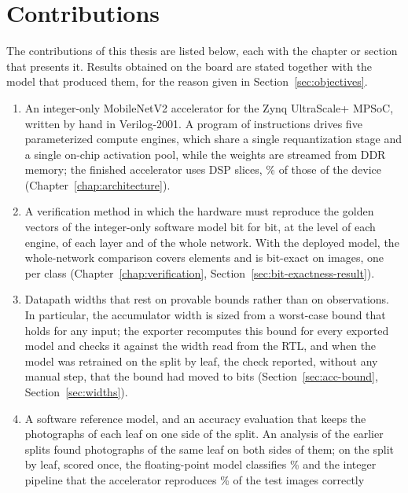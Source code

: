 \section{Contributions}
\label{sec:contributions}

The contributions of this thesis are listed below, each with the chapter or
section that presents it. Results obtained on the board are stated together
with the model that produced them, for the reason given in
Section~\ref{sec:objectives}.

\begin{enumerate}
  \item An integer-only MobileNetV2 accelerator for the Zynq UltraScale+
    MPSoC, written by hand in Verilog-2001. A program of \thInstructions{}
    instructions drives five parameterized compute engines, which share a
    single requantization stage and a single on-chip activation pool, while
    the weights are streamed from DDR memory; the finished accelerator uses
    \thDspAccelAxi{} DSP slices, \thDspPctAccelAxi\% of those of the device
    (Chapter~\ref{chap:architecture}).
  \item A verification method in which the hardware must reproduce the golden
    vectors of the integer-only software model bit for bit, at the level of
    each engine, of each layer and of the whole network. With the deployed
    model, the whole-network comparison covers \thElements{} elements and is
    bit-exact on \thImagesVerified{} images, one per class
    (Chapter~\ref{chap:verification}, Section~\ref{sec:bit-exactness-result}).
  \item Datapath widths that rest on provable bounds rather than on
    observations. In particular, the accumulator width is sized from a
    worst-case bound that holds for any input; the exporter recomputes this
    bound for every exported model and checks it against the width read from
    the RTL, and when the model was retrained on the split by leaf, the check
    reported, without any manual step, that the bound had moved to
    \thAccBoundBits{} bits (Section~\ref{sec:acc-bound},
    Section~\ref{sec:widths}).
  \item A software reference model, and an accuracy evaluation that keeps the
    photographs of each leaf on one side of the split. An analysis of the
    earlier splits found photographs of the same leaf on both sides of them;
    on the split by leaf, scored once, the floating-point model classifies
    \thAccFloat\% and the integer pipeline that the accelerator reproduces
    \thAccInt\% of the \thAccTestImages{} test images correctly

\end{enumerate}
